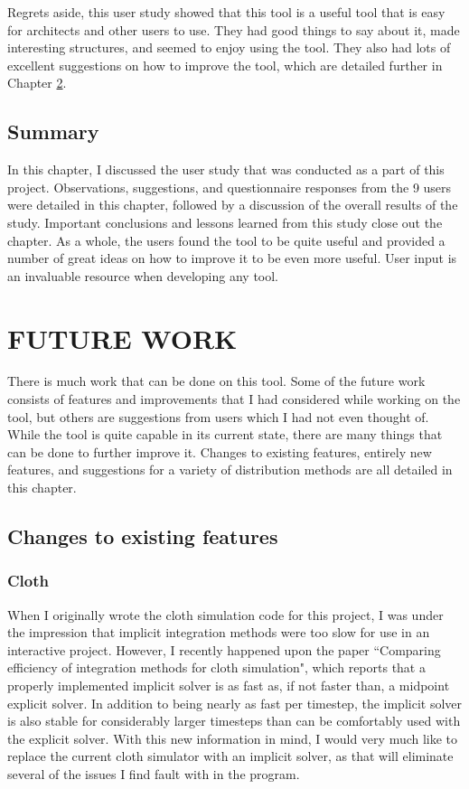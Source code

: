 \documentclass{thesis}
\begin{document}
Regrets aside, this user study showed that this tool is a useful tool that is easy for architects and other users to use.  They
had good things to say about it, made interesting structures, and seemed to enjoy using the tool.  They also had lots of excellent
suggestions on how to improve the tool, which are detailed further in Chapter \ref{chp:future}.

\section{Summary}
In this chapter, I discussed the user study that was conducted as a part of this project.  Observations, suggestions, and
questionnaire responses from the 9 users were detailed in this chapter, followed by a discussion of the overall results of the study.
Important conclusions and lessons learned from this study close out the chapter.
As a whole, the users found the tool to be quite useful and provided a number of great ideas on how to improve it to be even more
useful.  User input is an invaluable resource when developing any tool.


\chapter{FUTURE WORK}
\label{chp:future}
There is much work that can be done on this tool.  Some of the future work consists of features and improvements that I had considered
while working on the tool, but others are suggestions from users which I had not even thought of.  While the tool is quite capable in
its current state, there are many things that can be done to further improve it.  Changes to existing features, entirely new features,
and suggestions for a variety of distribution methods are all detailed in this chapter.

\section{Changes to existing features}

\subsection{Cloth}
\label{subsec:changecloth}
When I originally wrote the cloth simulation code for this project, I was under the impression that implicit integration methods were
too slow for use in an interactive project.  However, I recently happened upon the paper ``Comparing efficiency of integration methods
for cloth simulation"\cite{volino01comparingefficiency}\nocite{volino00fastcloth}, which reports that a properly implemented implicit
solver is as fast as, if not faster than, a midpoint explicit solver.  In addition to being nearly as fast per timestep, the implicit
solver is also stable for considerably larger timesteps than can be comfortably used with the explicit solver.  With this new
information in mind, I would very much like to replace the current cloth simulator with an implicit solver, as that will eliminate
several of the issues I find fault with in the program.
\end{document}

